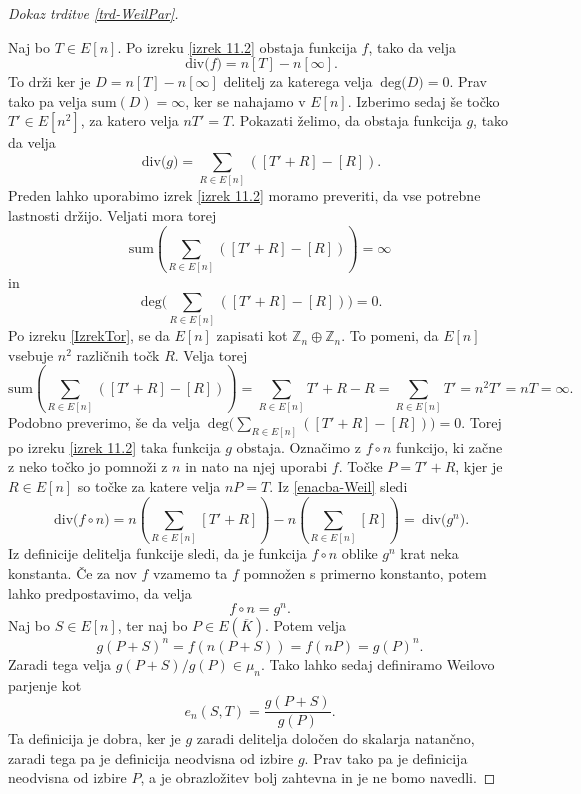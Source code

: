 \documentclass[12pt,a4paper,twoside]{article}
\theoremstyle{definition} %
\theoremstyle{plain} %
\numberwithin{equation}{section}  %
\newcommand{\E}[1]{E({#1})}
\newcommand{\DEG}[1]{\ \text{deg(}{#1}\text{)}}
\newcommand{\Div}[1]{\ \text{div(}{#1}\text{)}}
\begin{document}
\begin{proof}[Dokaz trditve \ref{trd-WeilPar}]~

Naj bo $T \in E[n]$.
Po izreku \ref{izrek 11.2} obstaja funkcija $f$, tako da velja
\begin{equation}
\label{enacba-Weil}
\Div{f} = n[T]-n[\infty].
\end{equation}
To drži ker je $D = n[T]-n[\infty]$ delitelj za katerega velja $\DEG{D} = 0$. Prav tako pa velja $\text{sum}(D) = \infty$, ker se nahajamo v $E[n]$.
Izberimo sedaj še točko $T' \in E[n^2]$, za katero velja $nT' = T$. Pokazati želimo, da obstaja funkcija $g$, tako da velja
$$\Div{g} = \sum_{R \in E[n]}([T' + R]- [R]).$$
Preden lahko uporabimo izrek \ref{izrek 11.2} moramo preveriti, da vse potrebne lastnosti držijo. Veljati mora torej 
$$\text{sum}( \sum_{R \in E[n]}([T' + R]- [R])) = \infty$$
 in
 $$\DEG{ \sum_{R \in E[n]}([T' + R]- [R])} = 0.$$
Po izreku \ref{IzrekTor}, se da $E[n]$ zapisati kot $\mathbb{Z}_n \oplus \mathbb{Z}_n$. To pomeni, da $E[n]$ vsebuje $n^2$ različnih točk $R$. Velja torej
$$\text{sum}(\sum_{R \in E[n]}([T' + R]- [R])) = \sum_{R \in E[n]} T' +R-R = \sum_{R \in E[n]} T' = n^2T' = nT = \infty.$$
Podobno preverimo, še da velja $\DEG{\sum_{R \in E[n]}([T' + R]- [R])} = 0.$ Torej po izreku \ref{izrek 11.2} taka funkcija $g$ obstaja.
Označimo z $f \circ n$ funkcijo, ki začne z neko točko jo pomnoži z $n$ in nato na njej uporabi $f$. Točke $P = T' + R$, kjer je $R\in E[n]$ so točke za katere velja $nP=T$. Iz \ref{enacba-Weil}
sledi
$$\Div{f \circ n} = n(\sum_{R \in E[n]}[T' + R]) - n(\sum_{R \in E[n]}[R]) = \Div{g^n}.$$
Iz definicije delitelja funkcije sledi, da je funkcija $f \circ n$ oblike $g^n$ krat neka konstanta. Če za nov $f$ vzamemo ta $f$ pomnožen s primerno konstanto, potem lahko predpostavimo, da velja
$$f \circ n = g^n.$$
Naj bo $S \in E[n]$, ter naj bo $P \in \E{\overline{K}}$. Potem velja
$$g(P+S)^n = f(n(P+S)) = f(nP) = g(P)^n.$$
Zaradi tega velja $g(P+S)/g(P) \in \mu_n$.
Tako lahko sedaj definiramo Weilovo parjenje kot
$$e_n(S,T) = \frac{g(P+S)}{g(P)}.$$
Ta definicija je dobra, ker je $g$ zaradi delitelja določen do skalarja natančno, zaradi tega pa je definicija neodvisna od izbire $g$. Prav tako pa je definicija neodvisna od izbire $P$, a je obrazložitev bolj zahtevna in je ne bomo navedli.


\end{proof}
\end{document}
